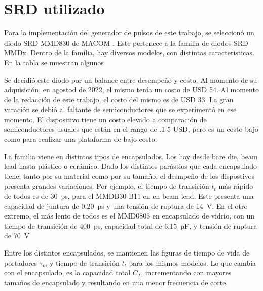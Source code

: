 \section{SRD utilizado}

Para la implementación del generador de pulsos de este trabajo, se seleccionó un
diodo SRD MMD830 de MACOM \cite{mmd830-datasheet}. Este pertenece a la familia
de diodos SRD MMDx.  Dentro de la familia, hay diversos modelos, con distintas
características. En la tabla se muestran algunos

Se decidió este diodo por un balance entre desempeño y costo. Al momento de su
adquisición, en agostod de 2022, el mismo tenía un costo de USD 54. Al momento
de la redacción de este trabajo, el costo del mismo es de USD 33. La gran
varación se debió al faltante de semiconductores que se experimentó en ese
momento. El dispositivo tiene un costo elevado a comparación de semiconductores
usuales que están en el rango de .1-5 USD, pero es un costo bajo como para
realizar una plataforma de bajo costo.

La familia viene en distintos tipos de encapsulados. Los hay desde bare die,
beam lead hasta plástico o cerámico. Dado los distintos parástios que cada
encapsulado tiene, tanto por su material como por su tamaño, el desmpeño de los
dispostivos presenta grandes variaciones. Por ejemplo, el tiempo de transición
$t_t$ más rápido de todos es de \qty{30}{\pico\second}, para el MMDB30-B11 en
en beam lead. Este presenta una capacidad de juntura de \qty{0.20}{\pico\second}
y una tensión de ruptura de \qty{14}{\volt}. En el otro extremo, el más lento de
todos es el MMD0803 en encapsulado de vidrio, con un tiempo de transición de
\qty{400}{\pico\second}, capacidad total de \qty{6.15}{\pico\farad}, y tensión
de ruptura de \qty{70}{\volt}

Entre los distintos encapsulados, se mantienen las figuras de tiempo de vida de
portadores $\tau_m$ y tiempo de transición $t_t$ para los mismos modelos. Lo que
cambia con el encapsulado, es la capacidad total $C_T$, incrementando con
mayores tamaños de encapsulado y resultando en una menor frecuencia de corte.

